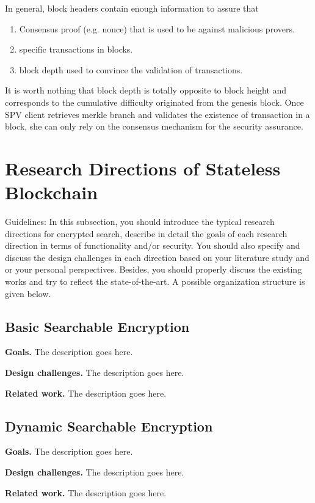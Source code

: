 \documentclass[conference]{IEEEtran}
\begin{document}
In general, block headers contain enough information to assure that 
\begin{enumerate}
  \item Consensus proof (e.g. nonce) that is used to be against malicious provers.
  \item specific transactions in blocks.
  \item block depth used to convince the validation of transactions.
\end{enumerate}

It is worth nothing that block depth is totally opposite to block height and corresponds to the cumulative difficulty originated from the genesis block.
%
Once SPV client retrieves merkle branch and validates the existence of transaction in a block, she can only rely on the consensus mechanism for the security assurance. 


\section{Research Directions of Stateless Blockchain}
%
Guidelines: In this subsection, you should introduce the typical research directions for encrypted search, describe in detail the goals of each research direction in terms of functionality and/or security. You should also specify and discuss the design challenges in each direction based on your literature study and or your personal perspectives. Besides, you should properly discuss the existing works and try to reflect the state-of-the-art. A possible organization structure is given below. 


\subsection{Basic Searchable Encryption}

\textbf{Goals.} The description goes here.


\textbf{Design challenges.} The description goes here.

\textbf{Related work.} The description goes here.

\subsection{Dynamic Searchable Encryption}

\textbf{Goals.} The description goes here.


\textbf{Design challenges.} The description goes here.

\textbf{Related work.} The description goes here.
\end{document}
